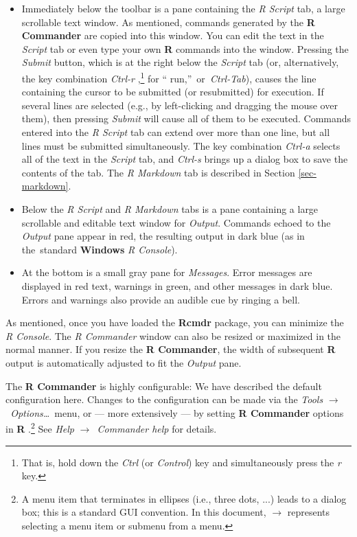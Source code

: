 \documentclass{article}%
\begin{document}
\begin{itemize}
\item Immediately below the toolbar is a pane containing the \emph{R Script}
tab, a large scrollable text window. As mentioned, commands generated by the
\textbf{R Commander} are copied into this window. You can edit the text in the
\emph{Script} tab or even type your own \textbf{R} commands into the window.
Pressing the \emph{Submit} button, which is at the right below the
\emph{Script} tab (or, alternatively, the key combination \emph{Ctrl-r}%
,\footnote{That is, hold down the \emph{Ctrl} (or \emph{Control}) key and
simultaneously press the \emph{r} key.} for \textquotedblleft
run,\textquotedblright\ or\emph{\ Ctrl-Tab}), causes the line containing the
cursor to be submitted (or resubmitted) for execution. If several lines are
selected (e.g., by left-clicking and dragging the mouse over them), then
pressing \emph{Submit} will cause all of them to be executed. Commands entered
into the \emph{R Script} tab can extend over more than one line, but all lines
must be submitted simultaneously. The key combination \emph{Ctrl-a} selects
all of the text in the \emph{Script} tab, and \emph{Ctrl-s} brings up a dialog
box to save the contents of the tab. The \emph{R Markdown} tab is described in
Section \ref{sec-markdown}.

\item Below the \emph{R Script} and \emph{R Markdown} tabs is a pane
containing a large scrollable and editable text window for \emph{Output}.
Commands echoed to the \emph{Output} pane appear in red, the resulting output
in dark blue (as in the\ standard \textbf{Windows} \emph{R Console}).

\item At the bottom is a small gray pane for \emph{Messages}. Error messages
are displayed in red text, warnings in green, and other messages in dark blue.
Errors and warnings also provide an audible cue by ringing a bell.
\end{itemize}

As mentioned, once you have loaded the \textbf{Rcmdr} package, you can
minimize the \emph{R Console}. The \emph{R Commander} window can also be
resized or maximized in the normal manner. If you resize the \textbf{R
Commander}, the width of subsequent \textbf{R} output is automatically
adjusted to fit the \emph{Output} pane.

The \textbf{R Commander} is highly configurable: We have described the default
configuration here. Changes to the configuration can be made via the
\emph{Tools }$\longrightarrow$\emph{\ Options\ldots}\ menu, or --- more
extensively --- by setting \textbf{R Commander }options in \textbf{R}%
.\footnote{A menu item that terminates in ellipses (i.e., three dots, ...)
leads to a dialog box; this is a standard GUI convention. In this document,
$\longrightarrow$ represents selecting a menu item or submenu from a menu.}
See \emph{Help }$\longrightarrow$\emph{\ Commander help} for details.
\end{document}
